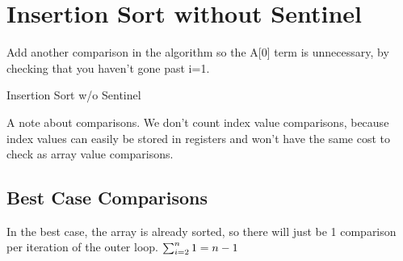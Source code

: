 \documentclass[english, 10pt]{article}
\begin{document}

\section{Insertion Sort without Sentinel}

Add another comparison in the algorithm so the A[0] term is unnecessary, by checking that you haven't gone past i=1.

\begin{algorithm}[H]
\caption{Insertion Sort w/o Sentinel}
\end{algorithm}

A note about comparisons. We don't count index value comparisons, because index values can easily be stored in registers and won't have the same
cost to check as array value comparisons.

\subsection{Best Case Comparisons}
In the best case, the array is already sorted, so there will just be 1 comparison per iteration of the outer loop. $\sum_{i=2}^{n} 1 = n-1$
\end{document}
